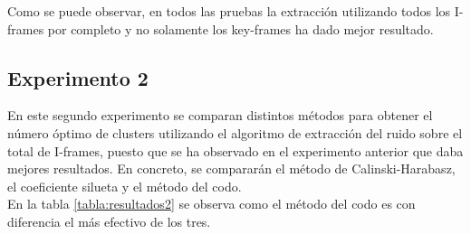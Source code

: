 Como se puede observar, en todos las pruebas la extracción utilizando todos los I-frames por completo y no solamente los key-frames ha dado mejor resultado.

\subsection{Experimento 2}

En este segundo experimento se comparan distintos métodos para obtener el número óptimo de clusters utilizando el algoritmo de extracción del ruido sobre el total de I-frames, puesto que se ha observado en el experimento anterior que daba mejores resultados. En concreto, se compararán el método de Calinski-Harabasz, el coeficiente silueta y el método del codo. \\

En la tabla \ref{tabla:resultados2} se observa como el método del codo es con diferencia el más efectivo de los tres.

